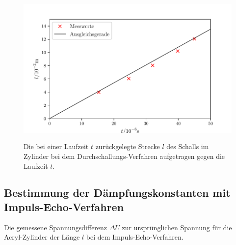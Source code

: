 \begin{figure}
	\centering
	\caption{Die bei einer Laufzeit $t$ zurückgelegte Strecke $l$ des Schalls im Zylinder bei dem Durchschallungs-Verfahren aufgetragen gegen die Laufzeit $t$.}
	\includegraphics[width=\linewidth-70pt,height=\textheight-70pt,keepaspectratio]{content/images/SchallgeschwindigkeitDurchschallung.pdf}
	\label{fig:SchallD}
\end{figure}

\subsection{Bestimmung der Dämpfungskonstanten mit Impuls-Echo-Verfahren}

\begin{table}
	\centering
	\caption{Die gemessene Spannungsdifferenz $\Delta U$ zur ursprünglichen Spannung für die Acryl-Zylinder der Länge $l$ bei dem Impuls-Echo-Verfahren.}
	
	\label{tab:Daempfung}
\end{table}

